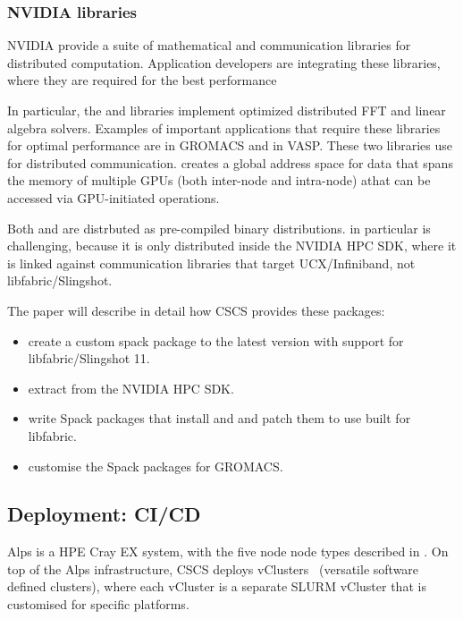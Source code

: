 \subsubsection{NVIDIA libraries}

NVIDIA provide a suite of mathematical and communication libraries for distributed computation.
Application developers are integrating these libraries, where they are required for the best performance

In particular, the \cufftmp and \cusolvermp libraries implement optimized distributed FFT and linear algebra solvers.
Examples of important applications that require these libraries for optimal performance are \cufftmp in GROMACS and \cusolvermp in VASP.
These two libraries use \nvshmem for distributed communication.
\nvshmem creates a global address space for data that spans the memory of multiple GPUs (both inter-node and intra-node) athat can be accessed via GPU-initiated operations.

Both \cufftmp and \cusolvermp are distrbuted as pre-compiled binary distributions.
\cufftmp in particular is challenging, because it is only distributed inside the NVIDIA HPC SDK, where it is linked against communication libraries that target UCX/Infiniband, not libfabric/Slingshot.

The paper will describe in detail how CSCS provides these packages:
\begin{itemize}
    \item create a custom spack package to the latest version \nvshmem with support for libfabric/Slingshot 11.
    \item extract \cufftmp from the NVIDIA HPC SDK.
    \item write Spack packages that install \cufftmp and \cusolvermp and patch them to use \nvshmem built for libfabric.
    \item customise the Spack packages for GROMACS.
\end{itemize}

\subsection{Deployment: CI/CD}

Alps is a HPE Cray EX system, with the five node node types described in .
On top of the Alps infrastructure, CSCS deploys vClusters~\cite{vClusters2023} (versatile software defined clusters), where each vCluster is a separate SLURM vCluster that is customised for specific platforms.

